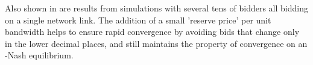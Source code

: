 Also shown in \cite{PSP} are results from simulations with several tens of bidders all bidding on a single network link. The addition of a small 'reserve price' per unit bandwidth helps to ensure rapid convergence by avoiding bids that change only in the lower decimal places, and still maintains the property of convergence on an \textepsilon-Nash equilibrium.
